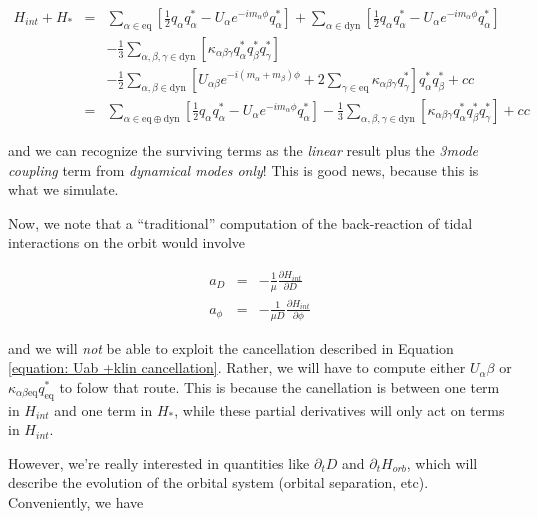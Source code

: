 \begin{eqnarray}\label{equation: concise Hint+H*}
H_{int}+H_{\ast}  & = & \sum_{\alpha\in\mathrm{eq}} \left[\frac{1}{2} q_\alpha q_\alpha^\ast - U_\alpha e^{-im_\alpha\phi}q_\alpha^\ast\right] + \sum_{\alpha\in\mathrm{dyn}} \left[\frac{1}{2} q_\alpha q_\alpha^\ast - U_\alpha e^{-im_\alpha\phi}q_\alpha^\ast\right] \\
                  &   & -\frac{1}{3}\sum_{\alpha,\beta,\gamma\in\mathrm{dyn}} \left[\kappa_{\alpha\beta\gamma}q_\alpha^\ast q_\beta^\ast q_\gamma^\ast \right] \\
                  &   & -\frac{1}{2} \sum_{\alpha,\beta\in\mathrm{dyn}} \left[ U_{\alpha\beta}e^{-i(m_\alpha+m_\beta)\phi} + 2\sum_{\gamma\in\mathrm{eq}} \kappa_{\alpha\beta\gamma}q_\gamma^\ast\right]q_\alpha^\ast q_\beta^\ast + cc\\
                  & = & \sum_{\alpha\in\mathrm{eq}\oplus\mathrm{dyn}} \left[\frac{1}{2} q_\alpha q_\alpha^\ast - U_\alpha e^{-im_\alpha\phi}q_\alpha^\ast\right] -\frac{1}{3}\sum_{\alpha,\beta,\gamma\in\mathrm{dyn}} \left[\kappa_{\alpha\beta\gamma}q_\alpha^\ast q_\beta^\ast q_\gamma^\ast \right] + cc
\end{eqnarray}

and we can recognize the surviving terms as the \emph{linear} result plus the \emph{3mode coupling} term from \emph{dynamical modes only}! This is good news, because this is what we simulate.

Now, we note that a ``traditional'' computation of the back-reaction of tidal interactions on the orbit would involve

\begin{eqnarray}
a_D & = & -\frac{1}{\mu}\frac{\partial H_{int}}{\partial D} \\
a_\phi & = & -\frac{1}{\mu D} \frac{\partial H_{int}}{\partial \phi}
\end{eqnarray}

and we will \emph{not} be able to exploit the cancellation described in Equation \ref{equation: Uab +klin cancellation}. Rather, we will have to compute either $U_\alpha\beta$ or $\kappa_{\alpha\beta\mathrm{eq}}q_\mathrm{eq}^\ast$ to folow that route. This is because the canellation is between one term in $H_{int}$ and one term in $H_\ast$, while these partial derivatives will only act on terms in $H_{int}$. 

However, we're really interested in quantities like $\partial_t D$ and $\partial_t H_{orb}$, which will describe the evolution of the orbital system (orbital separation, etc). Conveniently, we have

